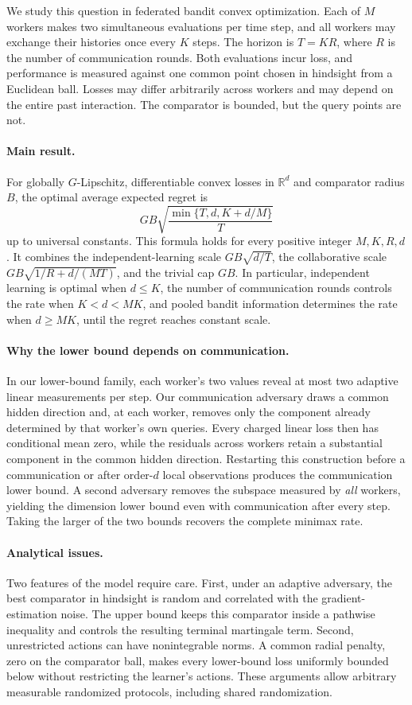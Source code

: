 \documentclass[11pt,a4paper]{article}
\numberwithin{equation}{section}
\theoremstyle{remark}
\newcommand{\R}{\mathbb R}
\begin{document}
We study this question in federated bandit convex optimization. Each of
$M$ workers makes two simultaneous evaluations per time step, and all
workers may exchange their histories once every $K$ steps. The horizon
is $T=KR$, where $R$ is the number of communication rounds. Both
evaluations incur loss, and performance is measured against one common
point chosen in hindsight from a Euclidean ball. Losses may differ
arbitrarily across workers and may depend on the entire past interaction.
The comparator is bounded, but the query points are not.

\paragraph{Main result.}
For globally $G$-Lipschitz, differentiable convex losses in $\R^d$ and
comparator radius $B$, the optimal average expected regret is
\[
GB\sqrt{\frac{\min\{T,d,K+d/M\}}{T}}
\]
up to universal constants. This formula holds for every positive integer
$M,K,R,d$. It combines the independent-learning scale $GB\sqrt{d/T}$,
the collaborative scale $GB\sqrt{1/R+d/(MT)}$, and the trivial cap $GB$.
In particular, independent learning is optimal when $d\le K$, the number
of communication rounds controls the rate when $K<d<MK$, and pooled
bandit information determines the rate when $d\ge MK$, until the regret
reaches constant scale.

\paragraph{Why the lower bound depends on communication.}
In our lower-bound family, each worker's two values reveal at most two
adaptive linear measurements per step.
Our communication adversary draws a common hidden direction and, at
each worker, removes only the component already determined by that
worker's own queries. Every charged linear loss then has conditional
mean zero, while the residuals across workers retain a substantial
component in the common hidden direction. Restarting this construction
before a communication or after order-$d$ local observations produces
the communication lower bound. A second adversary removes the subspace
measured by \emph{all} workers, yielding the dimension lower bound even
with communication after every step. Taking the larger of the two
bounds recovers the complete minimax rate.

\paragraph{Analytical issues.}
Two features of the model require care. First, under an adaptive
adversary, the best comparator in hindsight is random and correlated
with the gradient-estimation noise. The upper bound keeps this
comparator inside a pathwise inequality and controls the resulting
terminal martingale term. Second, unrestricted actions can have
nonintegrable norms. A common radial penalty, zero on the comparator
ball, makes every lower-bound loss uniformly bounded below without
restricting the learner's actions. These arguments allow arbitrary
measurable randomized protocols, including shared randomization.
\end{document}
